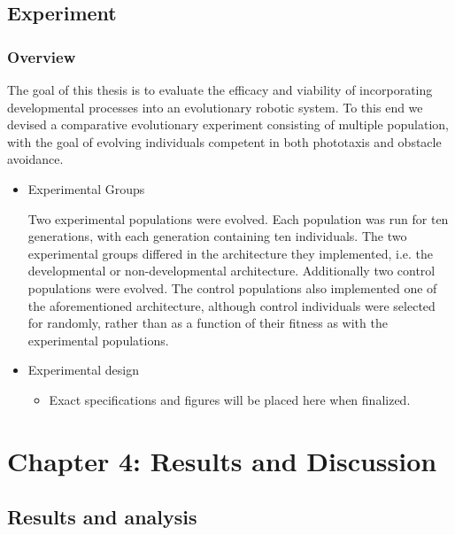 \documentclass[11pt]{article}
\begin{document}
\subsection*{Experiment}
\label{sec:orgheadline37}
\subsubsection*{Overview}
\label{sec:orgheadline36}

The goal of this thesis is to evaluate the efficacy and viability of incorporating developmental processes into an evolutionary robotic system. To this end we devised a comparative evolutionary experiment consisting of multiple population, with the goal of evolving individuals competent in both phototaxis and obstacle avoidance. 

\begin{itemize}
\item Experimental Groups
\label{sec:orgheadline33}

Two experimental populations were evolved. Each population was run for ten generations, with each generation containing ten individuals. The two experimental groups differed in the architecture they implemented, i.e. the developmental or non-developmental architecture. Additionally two control populations were evolved. The control populations also implemented one of the aforementioned architecture, although control individuals were selected for randomly, rather than as a function of their fitness as with the experimental populations.

\item Experimental design
\label{sec:orgheadline35}
\begin{itemize}
\item Exact specifications and figures will be placed here when finalized.
\label{sec:orgheadline34}
\end{itemize}
\end{itemize}
\section*{Chapter 4: Results and Discussion}
\label{sec:orgheadline41}
\subsection*{Results and analysis}
\label{sec:orgheadline39}
\end{document}
